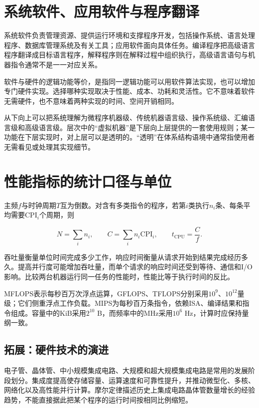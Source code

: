 \section{系统软件、应用软件与程序翻译}\label{CO01-software}

系统软件负责管理资源、提供运行环境和支撑程序开发，包括操作系统、语言处理程序、数据库管理系统及有关工具；应用软件面向具体任务。编译程序把高级语言程序翻译成目标语言程序，解释程序则在解释过程中组织执行，高级语言语句与机器指令通常不是一一对应关系。

软件与硬件的逻辑功能等价，是指同一逻辑功能可以用软件算法实现，也可以增加专门硬件实现。选择哪种实现取决于性能、成本、功耗和灵活性。它不意味着软件无需硬件，也不意味着两种实现的时间、空间开销相同。

从下向上可以把系统理解为微程序机器级、传统机器语言级、操作系统级、汇编语言级和高级语言级。层次中的``虚拟机器''是下层向上层提供的一套使用规则；某一功能在下层实现时，对上层可以是透明的。``透明''在体系结构语境中通常指使用者无需看见或处理其实现细节。

\section{性能指标的统计口径与单位}\label{CO01-performance-complete}

主频\(f\)与时钟周期\(T\)互为倒数。对含有多类指令的程序，若第\(i\)类执行\(n_i\)条、每条平均需要\(\mathrm{CPI}_i\)个周期，则

\[N=\sum_i n_i,\qquad C=\sum_i n_i\mathrm{CPI}_i,\qquad t_{\mathrm{CPU}}=\frac{C}{f}.\]

吞吐量衡量单位时间完成多少工作，响应时间衡量从请求开始到结果完成经历多久。提高并行度可能增加吞吐量，而单个请求的响应时间还受到等待、通信和I/O影响。比较两台机器运行同一任务的性能时，性能比等于执行时间的反比。

MFLOPS表示每秒百万次浮点运算，GFLOPS、TFLOPS分别采用\(10^9\)、\(10^{12}\)量级；它们侧重浮点工作负载。MIPS为每秒百万条指令，依赖ISA、编译结果和指令组成。容量中的KiB采用\(2^{10}\) B，而频率中的MHz采用\(10^6\) Hz，计算时应保持量纲一致。

\subsection{拓展：硬件技术的演进}\label{CO01-history-complete}

电子管、晶体管、中小规模集成电路、大规模和超大规模集成电路是常用的发展阶段划分。集成度提高使存储容量、运算速度和可靠性提升，并推动微型化、多核、网络化以及高性能并行计算。摩尔定律描述历史上集成电路晶体管数量增长的经验趋势，不能直接据此把某个程序的运行时间按相同比例缩短。

